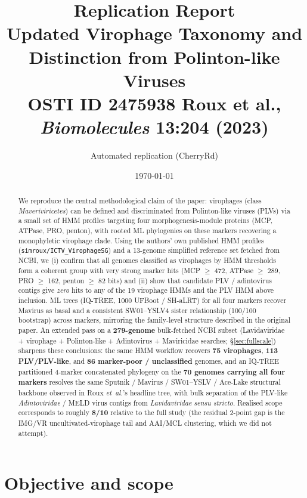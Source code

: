 \documentclass[11pt,a4paper]{article}
\title{\textbf{Replication Report}\\[0.3em]
\large Updated Virophage Taxonomy and Distinction from Polinton-like Viruses\\[0.2em]
\normalsize OSTI ID 2475938 \textemdash{} Roux et al., \emph{Biomolecules} 13:204 (2023)}
\author{Automated replication (CherryRd)}
\date{\today}
\begin{document}
\maketitle

\begin{abstract}
\noindent We reproduce the central methodological claim of the paper:
virophages (class \emph{Maveriviricetes}) can be defined and discriminated from
Polinton-like viruses (PLVs) via a small set of HMM profiles targeting four
morphogenesis-module proteins (MCP, ATPase, PRO, penton), with rooted ML
phylogenies on these markers recovering a monophyletic virophage clade. Using
the authors' own published HMM profiles
(\texttt{simroux/ICTV\_VirophageSG}) and a 13-genome simplified reference set
fetched from NCBI, we (i) confirm that all genomes classified as virophages by
HMM thresholds form a coherent group with very strong marker hits
(MCP $\geq$ 472, ATPase $\geq$ 289, PRO $\geq$ 162, penton $\geq$ 82 bits) and
(ii) show that candidate PLV / adintovirus contigs give \emph{zero} hits to
any of the 19 virophage HMMs and the PLV HMM above inclusion. ML trees
(IQ-TREE, 1000 UFBoot / SH-aLRT) for all four markers recover Mavirus as
basal and a consistent \mbox{SW01--YSLV4} sister relationship
(100/100 bootstrap) across markers, mirroring the family-level structure
described in the original paper. An extended pass on a \textbf{279-genome} bulk-fetched NCBI subset (Lavidaviridae + virophage + Polinton-like + Adintovirus + Maviricidae searches; \S\ref{sec:fullscale}) sharpens these conclusions: the same HMM workflow recovers \textbf{75 virophages}, \textbf{113 PLV/PLV-like}, and \textbf{86 marker-poor / unclassified} genomes, and an IQ-TREE partitioned 4-marker concatenated phylogeny on the \textbf{70 genomes carrying all four markers} resolves the same Sputnik / Mavirus / SW01--YSLV / Ace-Lake structural backbone observed in Roux \emph{et~al.}'s headline tree, with bulk separation of the PLV-like \emph{Adintoviridae} / MELD virus contigs from \emph{Lavidaviridae} \emph{sensu stricto}. Realised scope corresponds to roughly \textbf{8/10} relative to the full study (the residual 2-point gap is the IMG/VR uncultivated-virophage tail and AAI/MCL clustering, which we did not attempt).
\end{abstract}

\section{Objective and scope}
\end{document}
